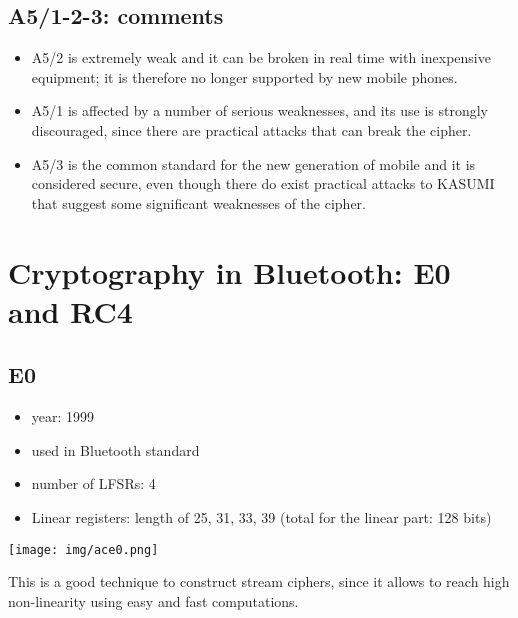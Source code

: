\documentclass[a4paper, 10pt, titlepage]{article}
\begin{document}
\subsection{A5/1-2-3: comments}
\begin{itemize}
\item A5/2 is extremely weak and it can be broken in real time with inexpensive equipment; it is therefore no longer supported by new mobile phones.
\item A5/1 is affected by a number of serious weaknesses, and its use is strongly discouraged, since there are practical attacks that can break the cipher.
\item A5/3 is the common standard for the new generation of mobile and it is considered secure, even though there do exist practical attacks to KASUMI that suggest some significant weaknesses of the cipher.
\end{itemize}

\section{Cryptography in Bluetooth: E0 and RC4}
\subsection{E0}
\begin{itemize}
\item year: 1999
\item used in Bluetooth standard
\item number of LFSRs: 4
\item Linear registers: length of 25, 31, 33, 39 (total for the linear part: 128 bits)
\end{itemize}
\begin{center}
\texttt{[image: img/ace0.png]}
\end{center}
This is a good technique to construct stream ciphers, since it allows to
reach high non-linearity using easy and fast computations.
\end{document}
